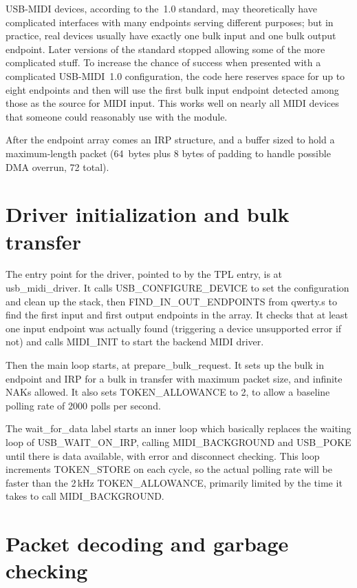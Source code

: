 USB-MIDI devices, according to the~1.0 standard, may theoretically have
complicated interfaces with many endpoints serving different purposes; but
in practice, real devices usually have exactly one bulk input and one bulk
output endpoint.  Later versions of the standard stopped allowing some of
the more complicated stuff.  To increase the chance of success when
presented with a complicated USB-MIDI~1.0 configuration, the code here
reserves space for up to eight endpoints and then will use the first bulk
input endpoint detected among those as the source for MIDI input.  This
works well on nearly all MIDI devices that someone could reasonably use with
the module.

After the endpoint array comes an IRP structure, and a buffer sized to hold
a maximum-length packet (64~bytes plus 8 bytes of padding to handle possible
DMA overrun, 72 total).

\section{Driver initialization and bulk transfer}

The entry point for the driver, pointed to by the TPL entry, is at
usb\_midi\_driver.  It calls USB\_CONFIGURE\_DEVICE to set the configuration
and clean up the stack, then FIND\_IN\_OUT\_ENDPOINTS from qwerty.s to find
the first input and first output endpoints in the array.  It checks that at
least one input endpoint was actually found (triggering a device unsupported
error if not) and calls MIDI\_INIT to start the backend MIDI driver.

Then the main loop starts, at prepare\_bulk\_request.  It sets up the bulk
in endpoint and IRP for a bulk in transfer with maximum packet size, and
infinite NAKs allowed.  It also sets TOKEN\_ALLOWANCE to 2, to allow a
baseline polling rate of 2000 polls per second.

The wait\_for\_data label starts an inner loop which basically replaces the
waiting loop of USB\_WAIT\_ON\_IRP, calling MIDI\_BACKGROUND and USB\_POKE
until there is data available, with error and disconnect checking.  This
loop increments TOKEN\_STORE on each cycle, so the actual polling rate will
be faster than the 2\,kHz TOKEN\_ALLOWANCE, primarily limited by the time it
takes to call MIDI\_BACKGROUND.

\section{Packet decoding and garbage checking}

